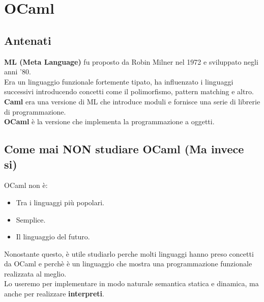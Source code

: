 \documentclass[12pt,a4paper]{article}
\let\oldsection\section
\renewcommand{\section}{\clearpage\oldsection}
\begin{document}
\section{OCaml}
\subsection{Antenati}
\textbf{ML (Meta Language)} fu proposto da Robin Milner nel 1972 e sviluppato negli anni '80.\\
Era un linguaggio funzionale fortemente tipato, ha influenzato i linguaggi successivi introducendo concetti come il polimorfismo, pattern matching e altro.\\
\textbf{Caml} era una versione di ML che introduce moduli e fornisce una serie di librerie di programmazione.\\
\textbf{OCaml} è la versione che implementa la programmazione a oggetti.
\subsection{Come mai NON studiare OCaml (Ma invece si)}
OCaml non è:
\begin{itemize}
  \item Tra i linguaggi più popolari.
  \item Semplice.
  \item Il linguaggio del futuro.
\end{itemize}
Nonostante questo, è utile studiarlo perche molti linguaggi hanno preso concetti da OCaml e perchè è un linguaggio che mostra una programmazione funzionale realizzata al meglio.\\
Lo useremo per implementare in modo naturale semantica statica e dinamica, ma anche per realizzare \textbf{interpreti}.
\end{document}
